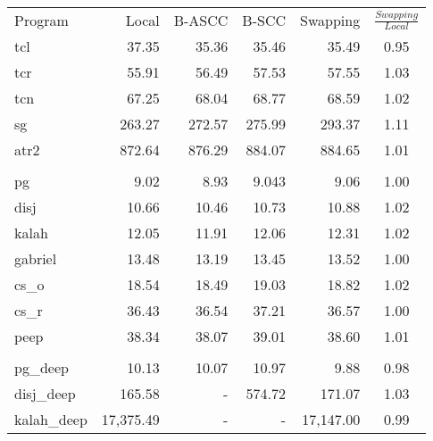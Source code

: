\documentclass{./tlp}
\begin{document}
\begin{table}[t]
\begin{tabular}{|l|r|r|r|r|c|}  
    \cline{1-6} 
    Program   & Local   & B-ASCC  & B-SCC   & Swapping & $\frac{Swapping}{Local}$
    \\\cline{1-6}\cline{1-6}                       
    tcl       & 37.35 & 35.36 & 35.46 & 35.49 & 0.95
    \\\cline{1-6}                                            
    tcr      & 55.91 & 56.49 & 57.53 & 57.55 & 1.03
    \\\cline{1-6}                                        
    tcn      & 67.25 & 68.04 & 68.77 & 68.59 & 1.02
    \\\cline{1-6}                                        
    sg      & 263.27 & 272.57 & 275.99 & 293.37 & 1.11
    \\\cline{1-6}                                        
    atr2      & 872.64 & 876.29 & 884.07 & 884.65 & 1.01
    \\\cline{1-6}                                        
    \multicolumn{6}{c}{}
    \\[-2ex]\cline{1-6}             
    pg        & 9.02  & 8.93  & 9.043  & 9.06 &  1.00
    \\\cline{1-6}                                        
    disj      & 10.66 & 10.46 & 10.73 & 10.88 & 1.02
    \\\cline{1-6}                                        
    kalah     & 12.05 & 11.91 & 12.06 & 12.31 & 1.02
    \\\cline{1-6}                                        
    gabriel   & 13.48 & 13.19 & 13.45 & 13.52 & 1.00
    \\\cline{1-6}                                        
    cs\_o     & 18.54 & 18.49 & 19.03 & 18.82 & 1.02
    \\\cline{1-6}                                        
    cs\_r     & 36.43 & 36.54 & 37.21 & 36.57 & 1.00
    \\\cline{1-6}                                        
    peep      & 38.34 & 38.07 & 39.01 & 38.60 & 1.01
    \\\cline{1-6}                                    
    \multicolumn{6}{c}{}
    \\[-2ex]\cline{1-6}             
    pg\_deep      & 10.13 & 10.07 & 10.97 & 9.88 & 0.98  
    \\\cline{1-6}                                    
    disj\_deep    & 165.58 &    -    & 574.72 & 171.07 & 1.03 
    \\\cline{1-6}                                    
    kalah\_deep   & 17,375.49 &    -    &    -    & 17,147.00 & 0.99

\end{tabular}
\end{table}
\end{document}
